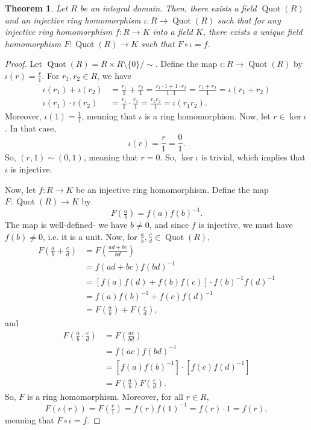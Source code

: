 \documentclass[a4paper, openany]{memoir}
\theoremstyle{definition}
\theoremstyle{plain}
\newtheorem{theorem}[definition]{Theorem}
\begin{document}
    \begin{theorem}
        Let $R$ be an integral domain. Then, there exists a field $\operatorname{Quot}(R)$ and an injective ring homomorphism $\iota \colon R \to \operatorname{Quot}(R)$ such that for any injective ring homomorphism $f \colon R \to K$ into a field $K$, there exists a unique field homomorphism $F \colon \operatorname{Quot}(R) \to K$ such that $F \circ \iota = f$.
    \end{theorem}
    \begin{proof}
        Let $\operatorname{Quot}(R) = R \times R \setminus \{0\} / {\sim}$. Define the map $\iota \colon R \to \operatorname{Quot}(R)$ by $\iota(r) = \frac{r}{1}$. For $r_1, r_2 \in R$, we have
        \begin{align*}
            \iota(r_1) + \iota(r_2) &= \frac{r_1}{1} + \frac{r_2}{1} = \frac{r_1 \cdot 1 + 1 \cdot r_2}{1 \cdot 1} = \frac{r_1 + r_2}{1} = \iota(r_1 + r_2) \\
            \iota(r_1) \cdot \iota(r_2) &= \frac{r_1}{1} \cdot \frac{r_2}{1} = \frac{r_1 r_2}{1} = \iota(r_1 r_2).
        \end{align*}
        Moreover, $\iota(1) = \frac{1}{1}$, meaning that $\iota$ is a ring homomorphism. Now, let $r \in \ker \iota$. In that case, 
        \[\iota(r) = \frac{r}{1} = \frac{0}{1}.\]
        So, $(r, 1) \sim (0, 1)$, meaning that $r = 0$. So, $\ker \iota$ is trivial, which implies that $\iota$ is injective.

        Now, let $f \colon R \to K$ be an injective ring homomorphism. Define the map $F \colon \operatorname{Quot}(R) \to K$ by
        \[F(\tfrac{a}{b}) = f(a) f(b)^{-1}.\]
        The map is well-defined- we have $b \neq 0$, and since $f$ is injective, we must have $f(b) \neq 0$, i.e. it is a unit. Now, for $\frac{a}{b}, \frac{c}{d} \in \operatorname{Quot}(R)$,
        \begin{align*}
            F(\tfrac{a}{b} + \tfrac{c}{d}) &= F(\tfrac{ad + bc}{bd}) \\
            &= f(ad + bc) f(bd)^{-1} \\
            &= [f(a)f(d) + f(b)f(c)] \cdot f(b)^{-1} f(d)^{-1} \\
            &= f(a)f(b)^{-1} + f(c)f(d)^{-1} \\
            &= F(\tfrac{a}{b}) + F(\tfrac{c}{d}),
        \end{align*}
        and
        \begin{align*}
            F(\tfrac{a}{b} \cdot \tfrac{c}{d}) &= F(\tfrac{ac}{bd}) \\
            &= f(ac) f(bd)^{-1} \\
            &= [f(a) f(b)^{-1}] \cdot [f(c) f(d)^{-1}] \\
            &= F(\tfrac{a}{b}) F(\tfrac{c}{d}).
        \end{align*}
        So, $F$ is a ring homomorphism. Moreover, for all $r \in R$, 
        \[F(\iota(r)) = F(\tfrac{r}{1}) = f(r) f(1)^{-1} = f(r) \cdot 1 = f(r),\]
        meaning that $F \circ \iota = f$.


\end{proof}
\end{document}
